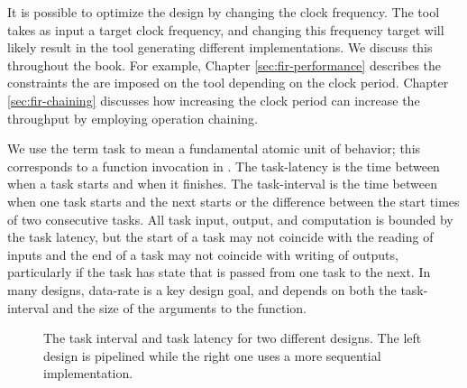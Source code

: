 \begin{aside}
It is possible to optimize the design by changing the clock frequency. The \VHLS tool takes as input a target clock frequency, and changing this frequency target will likely result in the tool generating different implementations. We discuss this throughout the book. For example, Chapter \ref{sec:fir-performance} describes the constraints the are imposed on the \VHLS tool depending on the clock period. Chapter \ref{sec:fir-chaining} discusses how increasing the clock period can increase the throughput by employing operation chaining.
\end{aside}

We use the term \gls{task} to mean a fundamental atomic unit of behavior; this corresponds to a function invocation in \VHLS.  The \gls{task-latency} is the time between when a task starts and when it finishes.  The \gls{task-interval} is the time between when one task starts and the next starts or the difference between the start times of two consecutive tasks.  All task input, output, and computation is bounded by the task latency, but the start of a task may not coincide with the reading of inputs and the end of a task may not coincide with writing of outputs, particularly if the task has state that is passed from one task to the next.  In many designs, \gls{data-rate} is a key design goal, and depends on both the \gls{task-interval} and the size of the arguments to the function.

\begin{figure}
\centering
\def\svgwidth{\columnwidth}

\caption{The task interval and task latency for two different designs. The left design is pipelined while the right one uses a more sequential implementation.}
\label{fig:intervalDuration}
\end{figure}

